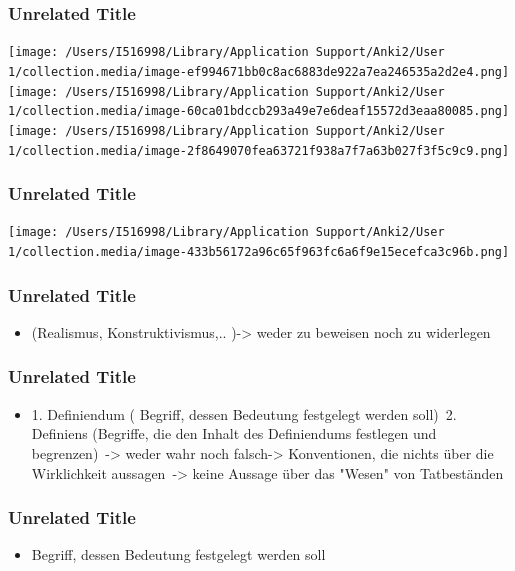 \documentclass[
    11pt,
    aspectratio=169,
]{beamer}
\begin{document}
\begin{frame}
\frametitle{Unrelated Title}

\begin{center}
\texttt{[image: /Users/I516998/Library/Application Support/Anki2/User 1/collection.media/image-ef994671bb0c8ac6883de922a7ea246535a2d2e4.png]}
\texttt{[image: /Users/I516998/Library/Application Support/Anki2/User 1/collection.media/image-60ca01bdccb293a49e7e6deaf15572d3eaa80085.png]}
\texttt{[image: /Users/I516998/Library/Application Support/Anki2/User 1/collection.media/image-2f8649070fea63721f938a7f7a63b027f3f5c9c9.png]}
\end{center}


\note[item]{}
\end{frame}
\begin{frame}
\frametitle{Unrelated Title}

\begin{center}
\texttt{[image: /Users/I516998/Library/Application Support/Anki2/User 1/collection.media/image-433b56172a96c65f963fc6a6f9e15ecefca3c96b.png]}
\end{center}


\note[item]{}
\end{frame}
\begin{frame}
\frametitle{Unrelated Title}


\begin{itemize}
\item (Realismus, Konstruktivismus,.. )-> weder zu beweisen noch zu widerlegen 
\end{itemize}

\note[item]{}
\end{frame}
\begin{frame}
\frametitle{Unrelated Title}


\begin{itemize}
\item 1. Definiendum ( Begriff, dessen Bedeutung festgelegt werden soll) 2. Definiens (Begriffe, die den Inhalt des Definiendums festlegen und begrenzen) -> weder wahr noch falsch-> Konventionen, die nichts über die Wirklichkeit aussagen -> keine Aussage über das "Wesen" von Tatbeständen 
\end{itemize}

\note[item]{}
\end{frame}
\begin{frame}
\frametitle{Unrelated Title}


\begin{itemize}
\item Begriff, dessen Bedeutung festgelegt werden soll
\end{itemize}

\note[item]{}
\end{frame}
\end{document}
